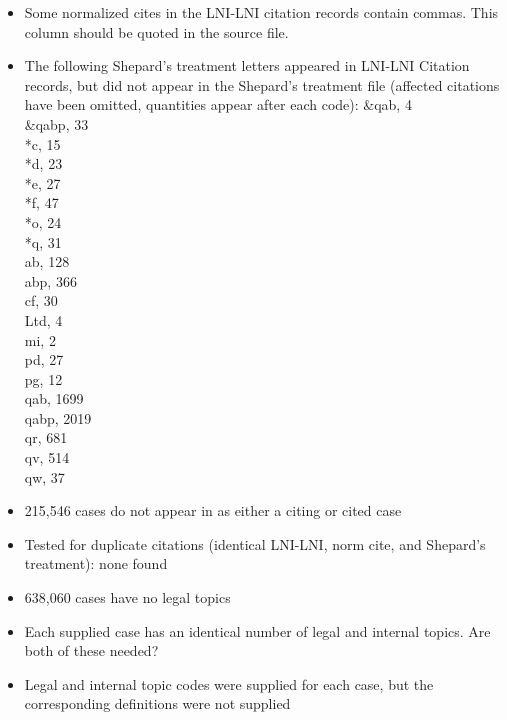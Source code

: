 \documentclass[10pt, letterpaper]{article}
\begin{document}
\begin{spacing}{1.0}
\begin{itemize}
    \item {\color{red}Some normalized cites in the LNI-LNI citation records contain commas.  This column should be quoted in the source file.}
    \item {\color{red}The following Shepard's treatment letters appeared in LNI-LNI Citation records, but did not appear in the Shepard's treatment file} (affected citations have been omitted, quantities appear after each code):
    \&qab, 4\\
    \&qabp, 33\\
    *c, 15\\
    *d, 23\\
    *e, 27\\
    *f, 47\\
    *o, 24\\
    *q, 31\\
    ab, 128\\
    abp, 366\\
    cf, 30\\
    Ltd, 4\\
    mi, 2\\
    pd, 27\\
    pg, 12\\
    qab, 1699\\
    qabp, 2019\\
    qr, 681\\
    qv, 514\\
    qw, 37\\
    
    \item 215,546 cases do not appear in as either a citing or cited case
    
    \item Tested for duplicate citations (identical LNI-LNI, norm cite, and Shepard's treatment):  none found
    
    \item 638,060 cases have no legal topics
    
    \item {\color{red}Each supplied case has an identical number of legal and internal topics.  Are both of these needed?}
    
    \item {\color{red}Legal and internal topic codes were supplied for each case, but the corresponding definitions were not supplied}
    
\end{itemize}

\end{spacing}
\end{document}
